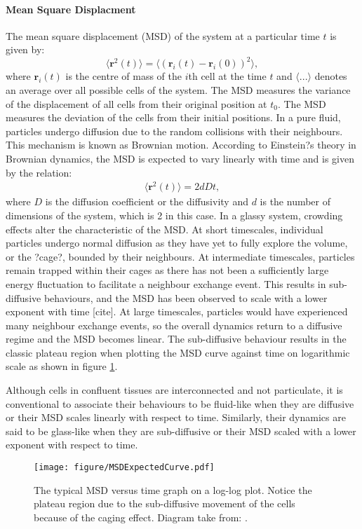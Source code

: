 \documentclass[a4paper,12pt]{article}
\begin{document}
\paragraph{Mean Square Displacment}
The mean square displacement (MSD) of the system at a particular time $t$ is given by:
\begin{equation}
\langle{\bm{r}^2(t)\rangle} = \langle{\left(\bm{r}_i(t) - \bm{r}_i(0)\right)^2\rangle},
\end{equation}
where $\bm{r}_i (t)$ is the centre of mass of the $i$th cell at the time $t$ and $\langle...\rangle$ denotes an average over all possible cells of the system. The MSD measures the variance of the displacement of all cells from their original position at $t_0$. The MSD measures the deviation of the cells from their initial positions. In a pure fluid, particles undergo diffusion due to the random collisions with their neighbours. This mechanism is known as Brownian motion. According to Einstein?s theory in Brownian dynamics, the MSD is expected to vary linearly with time and is given by the relation:
\begin{eqnarray}
\langle{\bm{r}^2(t)\rangle} = 2dDt, 
\end{eqnarray}
where $D$ is the diffusion coefficient or the diffusivity and $d$ is the number of dimensions of the system, which is 2 in this case. In a glassy system, crowding effects alter the characteristic of the MSD. At short timescales, individual particles undergo normal diffusion as they have yet to fully explore the volume, or the ?cage?, bounded by their neighbours. At intermediate timescales, particles remain trapped within their cages as there has not been a sufficiently large energy fluctuation to facilitate a neighbour exchange event. This results in sub-diffusive behaviours, and the MSD has been observed to scale with a lower exponent with time [cite]. At large timescales, particles would have experienced many neighbour exchange events, so the overall dynamics return to a diffusive regime and the MSD becomes linear. The sub-diffusive behaviour results in the classic plateau region when plotting the MSD curve against time on logarithmic scale as shown in figure \ref{fig:MSDExpectedCurve}. 

Although cells in confluent tissues are interconnected and not particulate, it is conventional to associate their behaviours to be fluid-like when they are diffusive or their MSD scales linearly with respect to time. Similarly, their dynamics are said to be glass-like when they are sub-diffusive or their MSD scaled with a lower exponent with respect to time.
\begin{figure}[h]
\centering
\texttt{[image: figure/MSDExpectedCurve.pdf]}
\caption{The typical MSD versus time graph on a log-log plot. Notice the plateau region due to the sub-diffusive movement of the cells because of the caging effect. Diagram take from: \cite{hofling2013}.}
\label{fig:MSDExpectedCurve}
\end{figure}
\end{document}

